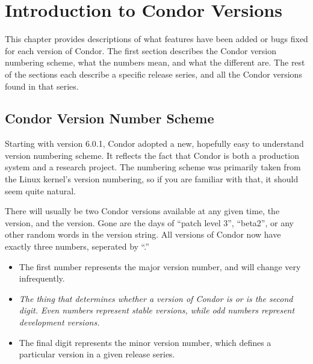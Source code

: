 \section{\label{sec:History-Intro}Introduction to Condor Versions}

This chapter provides descriptions of what features have been added or
bugs fixed for each version of Condor.
The first section describes the Condor version numbering scheme, what
the numbers mean, and what the different  are.
The rest of the sections each describe a specific release series, and
all the Condor versions found in that series.

\subsection{\label{sec:Version-Number-Scheme}
Condor Version Number Scheme}

Starting with version 6.0.1, Condor adopted a new, hopefully easy to
understand version numbering scheme.
It reflects the fact that Condor is both a production system and a
research project.
The numbering scheme was primarily taken from the Linux kernel's
version numbering, so if you are familiar with that, it should seem
quite natural.

There will usually be two Condor versions available at any given time,
the  version, and the  version.
Gone are the days of ``patch level 3'', ``beta2'', or any other random
words in the version string.
All versions of Condor now have exactly three numbers, seperated by
``.''   

\begin{itemize}

\item The first number represents the major version number, and will
change very infrequently.

\item \emph{The thing that determines whether a version of Condor is
 or  is the second digit.
Even numbers represent stable versions, while odd numbers represent
development versions.}

\item The final digit represents the minor version number, which
defines a particular version in a given release series.

\end{itemize}


